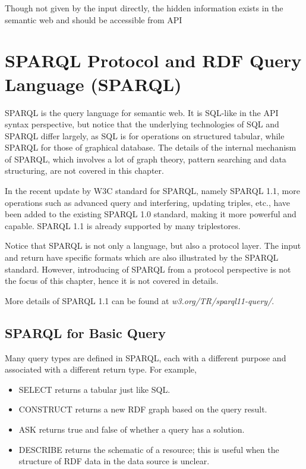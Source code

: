 Though not given by the input directly, the hidden information exists in the semantic web and should be accessible from API

\section{SPARQL Protocol and RDF Query Language (SPARQL)}

SPARQL is the query language for semantic web. It is SQL-like in the API syntax perspective, but notice that the underlying technologies of SQL and SPARQL differ largely, as SQL is for operations on structured tabular, while SPARQL for those of graphical database. The details of the internal mechanism of SPARQL, which involves a lot of graph theory, pattern searching and data structuring, are not covered in this chapter.

In the recent update by W3C standard for SPARQL, namely SPARQL 1.1, more operations such as advanced query and interfering, updating triples, etc., have been added to the existing SPARQL 1.0 standard, making it more powerful and capable. SPARQL 1.1 is already supported by many triplestores.

Notice that SPARQL is not only a language, but also a protocol layer. The input and return have specific formats which are also illustrated by the SPARQL standard. However, introducing of SPARQL from a protocol perspective is not the focus of this chapter, hence it is not covered in details.

More details of SPARQL 1.1 can be found at \textit{w3.org/TR/sparql11-query/}.

\subsection{SPARQL for Basic Query}

Many query types are defined in SPARQL, each with a different purpose and associated with a different return type. For example,
\begin{itemize}
	\item SELECT returns a tabular just like SQL.
	\item CONSTRUCT returns a new RDF graph based on the query result.
	\item ASK returns true and false of whether a query has a solution.
	\item DESCRIBE returns the schematic of a resource; this is useful when the structure of RDF data in the data source is unclear.
\end{itemize}

